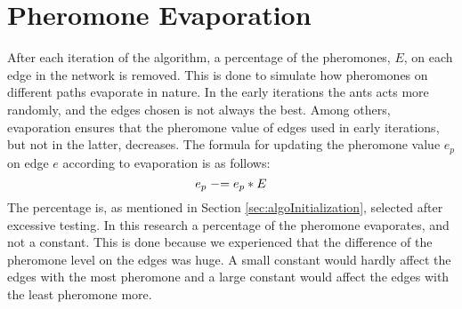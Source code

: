 \section{Pheromone Evaporation}

After each iteration of the algorithm, a percentage of the pheromones, $E$, on each edge in the network is removed. This is done to simulate how pheromones on different paths evaporate in nature. In the early iterations the ants acts more randomly, and the edges chosen is not always the best. Among others, evaporation ensures that the pheromone value of edges used in early iterations, but not in the latter, decreases. The formula for updating the pheromone value $e_p$ on edge $e$ according to evaporation is as follows: 
\newline
$$e_p \mathrel{-}= e_p*E$$
\newline
The percentage is, as mentioned in Section \vref{sec:algoInitialization}, selected after excessive testing. In this research a percentage of the pheromone evaporates, and not a constant. This is done because we experienced that the difference of the pheromone level on the edges was huge. A small constant would hardly affect the edges with the most pheromone and a large constant would affect the edges with the least pheromone more. 